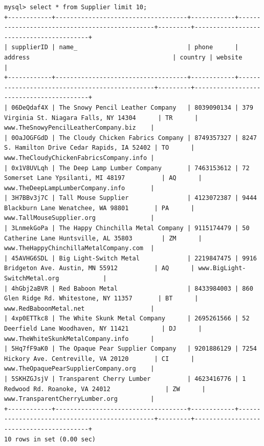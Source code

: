 \documentclass[american,extrafontsizes,12pt,portrait,letterpaper,oneside,onecolumn,final]{memoir}
\begin{document}
\begin{verbatim}
mysql> select * from Supplier limit 10;
+------------+------------------------------------+------------+-----------------------------------------------+---------+-----------------------------------------+
| supplierID | name_                              | phone      | address                                       | country | website                                 |
+------------+------------------------------------+------------+-----------------------------------------------+---------+-----------------------------------------+
| 06DeQdaf4X | The Snowy Pencil Leather Company   | 8039090134 | 379 Virginia St. Niagara Falls, NY 14304      | TR      | www.TheSnowyPencilLeatherCompany.biz    |
| 0OaJOGFGdD | The Cloudy Chicken Fabrics Company | 8749357327 | 8247 S. Hamilton Drive Cedar Rapids, IA 52402 | TO      | www.TheCloudyChickenFabricsCompany.info |
| 0x1V8UVLqh | The Deep Lamp Lumber Company       | 7463153612 | 72 Somerset Lane Ypsilanti, MI 48197          | AQ      | www.TheDeepLampLumberCompany.info       |
| 3H7BBv3j7C | Tall Mouse Supplier                | 4123072387 | 9444 Blackburn Lane Wenatchee, WA 98801       | PA      | www.TallMouseSupplier.org               |
| 3LnmekGoPa | The Happy Chinchilla Metal Company | 9115174479 | 50 Catherine Lane Huntsville, AL 35803        | ZM      | www.TheHappyChinchillaMetalCompany.com  |
| 45AVHG6SDL | Big Light-Switch Metal             | 2219847475 | 9916 Bridgeton Ave. Austin, MN 55912          | AQ      | www.BigLight-SwitchMetal.org            |
| 4hGbj2aBVR | Red Baboon Metal                   | 8433984003 | 860 Glen Ridge Rd. Whitestone, NY 11357       | BT      | www.RedBaboonMetal.net                  |
| 4xp0ETTkc8 | The White Skunk Metal Company      | 2695261566 | 52 Deerfield Lane Woodhaven, NY 11421         | DJ      | www.TheWhiteSkunkMetalCompany.info      |
| 5Hq7fF9aK0 | The Opaque Pear Supplier Company   | 9201886129 | 7254 Hickory Ave. Centreville, VA 20120       | CI      | www.TheOpaquePearSupplierCompany.org    |
| 5SKHZGJsjV | Transparent Cherry Lumber          | 4623416776 | 1 Redwood Rd. Roanoke, VA 24012               | ZW      | www.TransparentCherryLumber.org         |
+------------+------------------------------------+------------+-----------------------------------------------+---------+-----------------------------------------+
10 rows in set (0.00 sec)


\end{verbatim}
\end{document}
